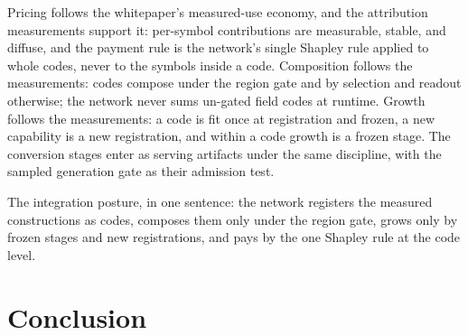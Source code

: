 \documentclass[11pt]{article}
\begin{document}
Pricing follows the whitepaper's measured-use economy, and the
attribution measurements support it: per-symbol contributions are
measurable, stable, and diffuse, and the payment rule is the
network's single Shapley rule applied to whole codes, never to the
symbols inside a code. Composition follows the measurements: codes
compose under the region gate and by selection and readout
otherwise; the network never sums un-gated field codes at runtime.
Growth follows the measurements: a code is fit once at registration
and frozen, a new capability is a new registration, and within a
code growth is a frozen stage. The conversion stages enter as
serving artifacts under the same discipline, with the sampled
generation gate as their admission test.

The integration posture, in one sentence: the network registers the
measured constructions as codes, composes them only under the
region gate, grows only by frozen stages and new registrations, and
pays by the one Shapley rule at the code level.

\section{Conclusion}
\end{document}
